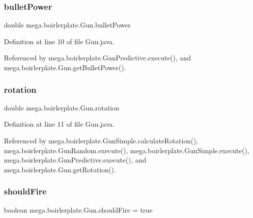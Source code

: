 \subsubsection{\texorpdfstring{bullet\+Power}{bulletPower}}
{\footnotesize\ttfamily double mega.\+boirlerplate.\+Gun.\+bullet\+Power\hspace{0.3cm}{\ttfamily [protected]}}



Definition at line 10 of file Gun.\+java.



Referenced by mega.\+boirlerplate.\+Gun\+Predictive.\+execute(), and mega.\+boirlerplate.\+Gun.\+get\+Bullet\+Power().

\mbox{\label{classmega_1_1boirlerplate_1_1_gun_ad5615ea434efe7faedcb5b15d9e80e03}} 
\subsubsection{\texorpdfstring{rotation}{rotation}}
{\footnotesize\ttfamily double mega.\+boirlerplate.\+Gun.\+rotation\hspace{0.3cm}{\ttfamily [protected]}}



Definition at line 11 of file Gun.\+java.



Referenced by mega.\+boirlerplate.\+Gun\+Simple.\+calculate\+Rotation(), mega.\+boirlerplate.\+Gun\+Random.\+execute(), mega.\+boirlerplate.\+Gun\+Simple.\+execute(), mega.\+boirlerplate.\+Gun\+Predictive.\+execute(), and mega.\+boirlerplate.\+Gun.\+get\+Rotation().

\mbox{\label{classmega_1_1boirlerplate_1_1_gun_a33502b9a7774f1681ea2f105f7c2211a}} 
\subsubsection{\texorpdfstring{should\+Fire}{shouldFire}}
{\footnotesize\ttfamily boolean mega.\+boirlerplate.\+Gun.\+should\+Fire = true\hspace{0.3cm}{\ttfamily [protected]}}



